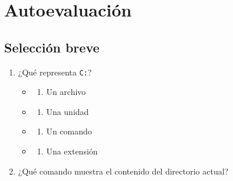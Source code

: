 \documentclass[
  spanish,
  letterpaper,
]{scrbook}
\providecommand{\tightlist}{%
  \setlength{\itemsep}{0pt}\setlength{\parskip}{0pt}}
\begin{document}

\chapter{Autoevaluación}\label{autoevaluaciuxf3n}

\section{Selección breve}\label{selecciuxf3n-breve}

\begin{enumerate}
\def\labelenumi{\arabic{enumi}.}
\tightlist
\item
  ¿Qué representa \texttt{C:}?

  \begin{itemize}
  \tightlist
  \item
    \begin{enumerate}
    \def\labelenumii{\alph{enumii})}
    \tightlist
    \item
      Un archivo
    \end{enumerate}
  \item
    \begin{enumerate}
    \def\labelenumii{\alph{enumii})}
    \setcounter{enumii}{1}
    \tightlist
    \item
      Una unidad
    \end{enumerate}
  \item
    \begin{enumerate}
    \def\labelenumii{\alph{enumii})}
    \setcounter{enumii}{2}
    \tightlist
    \item
      Un comando
    \end{enumerate}
  \item
    \begin{enumerate}
    \def\labelenumii{\alph{enumii})}
    \setcounter{enumii}{3}
    \tightlist
    \item
      Una extensión
    \end{enumerate}
  \end{itemize}
\item
  ¿Qué comando muestra el contenido del directorio actual?


\end{enumerate}
\end{document}
